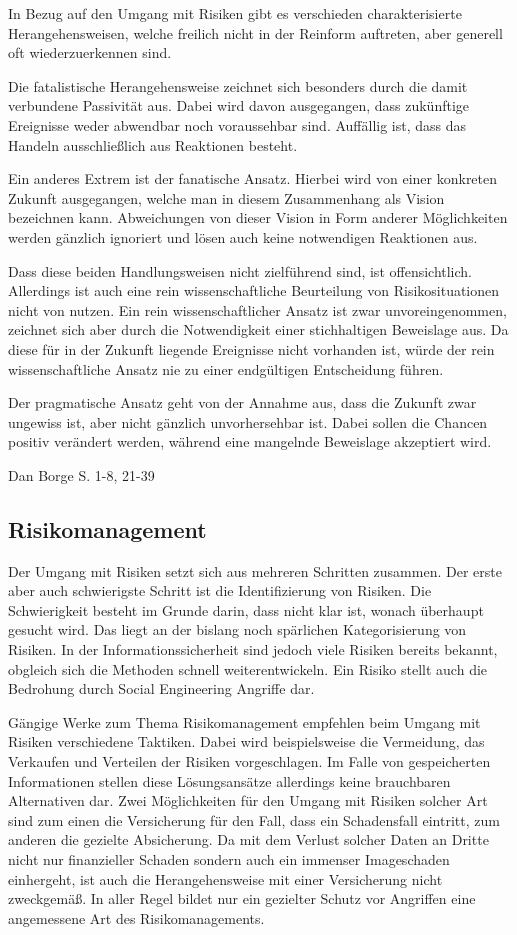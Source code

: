 In Bezug auf den Umgang mit Risiken gibt es verschieden charakterisierte Herangehensweisen, welche freilich nicht in der Reinform auftreten, aber generell oft wiederzuerkennen sind.

Die fatalistische Herangehensweise zeichnet sich besonders durch die damit verbundene Passivität aus. Dabei wird davon ausgegangen, dass zukünftige Ereignisse weder abwendbar noch voraussehbar sind. Auffällig ist, dass das Handeln ausschließlich aus Reaktionen besteht.

Ein anderes Extrem ist der fanatische Ansatz. Hierbei wird von einer konkreten Zukunft ausgegangen, welche man in diesem Zusammenhang als Vision bezeichnen kann. Abweichungen von dieser Vision in Form anderer Möglichkeiten werden gänzlich ignoriert und lösen auch keine notwendigen Reaktionen aus.

Dass diese beiden Handlungsweisen nicht zielführend sind,  ist offensichtlich. Allerdings ist auch eine rein wissenschaftliche Beurteilung von Risikosituationen nicht von nutzen. Ein rein wissenschaftlicher Ansatz ist zwar unvoreingenommen, zeichnet sich aber durch die Notwendigkeit einer stichhaltigen Beweislage aus. Da diese für in der Zukunft liegende Ereignisse nicht vorhanden ist, würde der rein wissenschaftliche Ansatz nie zu einer endgültigen Entscheidung führen.

Der pragmatische Ansatz geht von der Annahme aus, dass die Zukunft zwar ungewiss ist, aber nicht gänzlich unvorhersehbar ist. Dabei sollen die Chancen positiv verändert werden, während eine mangelnde Beweislage akzeptiert wird.

Dan Borge S. 1-8, 21-39

\subsection{Risikomanagement}\label{sub:risikomanagement}
Der Umgang mit Risiken setzt sich aus mehreren Schritten zusammen. Der erste aber auch schwierigste Schritt ist die Identifizierung von Risiken. Die Schwierigkeit besteht im Grunde darin, dass nicht klar ist, wonach überhaupt gesucht wird. Das liegt an der bislang noch spärlichen Kategorisierung von Risiken. In der Informationssicherheit sind jedoch viele Risiken bereits bekannt, obgleich sich die Methoden schnell weiterentwickeln. Ein Risiko stellt auch die Bedrohung durch Social Engineering Angriffe dar.

Gängige Werke zum Thema Risikomanagement empfehlen beim Umgang mit Risiken verschiedene Taktiken. Dabei wird beispielsweise die Vermeidung, das Verkaufen und Verteilen der Risiken vorgeschlagen. Im Falle von gespeicherten Informationen stellen diese Lösungsansätze allerdings keine brauchbaren Alternativen dar. Zwei Möglichkeiten für den Umgang mit Risiken solcher Art sind zum einen die Versicherung für den Fall, dass ein Schadensfall eintritt, zum anderen die gezielte Absicherung. Da mit dem Verlust solcher Daten an Dritte nicht nur finanzieller Schaden sondern auch ein immenser Imageschaden einhergeht, ist auch die Herangehensweise mit einer Versicherung nicht zweckgemäß. In aller Regel bildet nur ein gezielter Schutz vor Angriffen eine angemessene Art des Risikomanagements.

